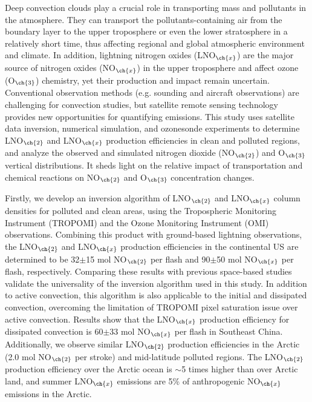 {
Deep convection clouds play a crucial role in transporting mass and pollutants in the atmosphere.
They can transport the pollutants-containing air from the boundary layer to the upper troposphere or even the lower stratosphere in a relatively short time, thus affecting regional and global atmospheric environment and climate.
In addition, lightning nitrogen oxides (LNO$_{\ch{x}}$) are the major source of nitrogen oxides (NO$_{\ch{x}}$) in the upper troposphere
and affect ozone (O$_{\ch{3}}$) chemistry, yet their production and impact remain uncertain.
Conventional observation methods (e.g. sounding and aircraft observations) are challenging for convection studies,
but satellite remote sensing technology provides new opportunities for quantifying emissions.
This study uses satellite data inversion, numerical simulation, and ozonesonde experiments to determine LNO$_{\ch{2}}$ and LNO$_{\ch{x}}$ production efficiencies in clean and polluted regions,
and analyze the observed and simulated nitrogen dioxide (NO$_{\ch{2}}$) and O$_{\ch{3}}$ vertical distributions.
It sheds light on the relative impact of transportation and chemical reactions on NO$_{\ch{2}}$ and O$_{\ch{3}}$ concentration changes.

Firstly, we develop an inversion algorithm of LNO$_{\ch{2}}$ and LNO$_{\ch{x}}$ column densities for polluted and clean areas, using the Tropospheric Monitoring Instrument (TROPOMI) and the Ozone Monitoring Instrument (OMI) observations.
Combining this product with ground-based lightning observations, the LNO$_{\ch{2}}$ and LNO$_{\ch{x}}$ production efficiencies in the continental US are determined to be 32$\pm$15 mol NO$_{\ch{2}}$ per flash and 90$\pm$50 mol NO$_{\ch{x}}$ per flash, respectively.
Comparing these results with previous space-based studies validate the universality of the inversion algorithm used in this study.
In addition to active convection, this algorithm is also applicable to the initial and dissipated convection, overcoming the limitation of TROPOMI pixel saturation issue over active convection.
Results show that the LNO$_{\ch{x}}$ production efficiency for dissipated convection is 60$\pm$33 mol NO$_{\ch{x}}$ per flash in Southeast China.
Additionally, we observe similar LNO$_{\ch{2}}$ production efficiencies in the Arctic (2.0 mol NO$_{\ch{2}}$ per stroke) and mid-latitude polluted regions.
The LNO$_{\ch{2}}$ production efficiency over the Arctic ocean is $\sim$5 times higher than over Arctic land, and summer LNO$_{\ch{x}}$ emissions are 5\% of anthropogenic NO$_{\ch{x}}$ emissions in the Arctic.

}
